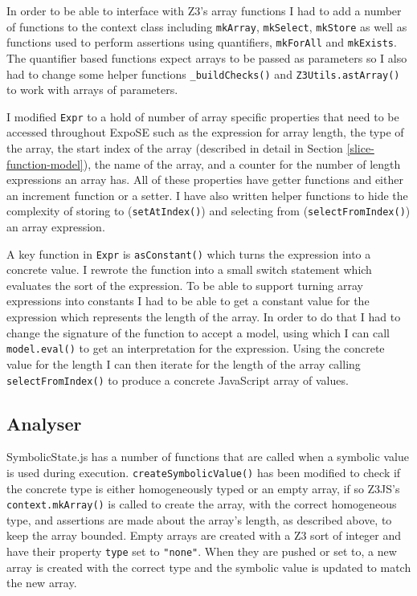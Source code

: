 \documentclass[]{final_report}
\begin{document}
In order to be able to interface with Z3's array functions I had to add a number of functions to the context class including \lstinline|mkArray|, \lstinline|mkSelect|, \lstinline|mkStore| as well as functions used to perform assertions using quantifiers, \lstinline|mkForAll| and \lstinline|mkExists|. The quantifier based functions expect arrays to be passed as parameters so I also had to change some helper functions \lstinline|_buildChecks()| and \lstinline|Z3Utils.astArray()| to work with arrays of parameters.

I modified \lstinline|Expr| to a hold of number of array specific properties that need to be accessed throughout ExpoSE such as the expression for array length, the type of the array, the start index of the array (described in detail in Section \ref{slice-function-model}), the name of the array, and a counter for the number of length expressions an array has. All of these properties have getter functions and either an increment function or a setter. I have also written helper functions to hide the complexity of storing to (\lstinline|setAtIndex()|) and selecting from (\lstinline|selectFromIndex()|) an array expression.

A key function in \lstinline|Expr| is \lstinline|asConstant()| which turns the expression into a concrete value. I rewrote the function into a small switch statement which evaluates the sort of the expression. To be able to support turning array expressions into constants I had to be able to get a constant value for the expression which represents the length of the array. In order to do that I had to change the signature of the function to accept a model, using which I can call \lstinline|model.eval()| to get an interpretation for the expression. Using the concrete value for the length I can then iterate for the length of the array calling \lstinline|selectFromIndex()| to produce a concrete JavaScript array of values.

\subsection{Analyser}
SymbolicState.js has a number of functions that are called when a symbolic value is used during execution. \lstinline|createSymbolicValue()| has been modified to check if the concrete type is either homogeneously typed or an empty array, if so Z3JS's \lstinline|context.mkArray()| is called to create the array, with the correct homogeneous type, and assertions are made about the array's length, as described above, to keep the array bounded. Empty arrays are created with a Z3 sort of integer and have their property \lstinline|type| set to \lstinline|"none"|. When they are pushed or set to, a new array is created with the correct type and the symbolic value is updated to match the new array.
\end{document}
